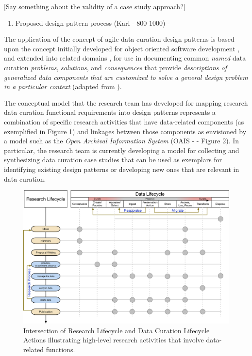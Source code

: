 \documentclass[paper]{ijdc-v9}
\begin{document}
{[}Say something about the validity of a case study approach?{]}

\begin{enumerate}
\def\labelenumi{\arabic{enumi}.}
\setcounter{enumi}{2}
\itemsep1pt\parskip0pt
\item
  Proposed design pattern process (Karl - 800-1000) -
\end{enumerate}

The application of the concept of agile data curation design patterns is
based upon the concept initially developed for object oriented software
development \autocite{gamma_design_1995}, and extended into related
domains
\autocites{daigneau_service_2011}{lasater_design_2010}{ackerman_patterns-based_2010}{schwinn_design_2005}{hohpe_enterprise_2003},
for use in documenting common \emph{named} data curation
\emph{problems}, \emph{solutions}, and \emph{consequences} that provide
\emph{descriptions of generalized data components that are customized to
solve a general design problem in a particular context} (adapted from
\autocite[section 1.1]{gamma_design_1995}).

The conceptual model that the research team has developed for mapping
research data curation functional requirements into design patterns
represents a combination of specific research activities that have
data-related components (as exemplified in Figure 1) and linkages
between those components as envisioned by a model such as the \emph{Open
Archival Information System} (OAIS -
\autocites{book_reference_2012}{_iso_2012}{oclc_open_2014} - Figure 2).
In particular, the research team is currently developing a model for
collecting and synthesizing data curation case studies that can be used
as exemplars for identifying existing design patterns or developing new
ones that are relevant in data curation.

\begin{figure}[htbp]
\centering
\includegraphics{Research-DataLifecycleIntegration.png}
\caption{Intersection of Research Lifecycle \autocite{_how_2014} and
Data Curation Lifecycle Actions
\autocite{digital_curation_centre_dcc_dcc_nd} illustrating high-level
research activities that involve data-related functions.}
\end{figure}
\end{document}
